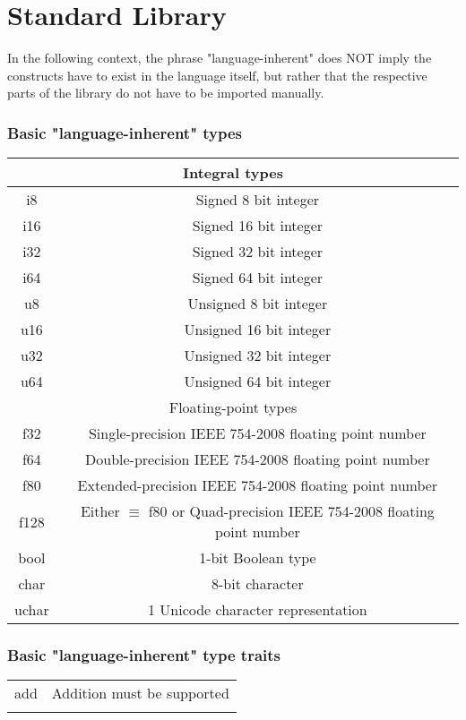 \documentclass{scrartcl}
\begin{document}
\part{Standard Library}

In the following context, the phrase "language-inherent" does NOT imply the constructs have to exist in the language itself, but rather that the respective parts of the library do not have to be imported manually.

\section{Basic "language-inherent" types}

\begin{table}[H]
    \centering
    \begin{tabular}{c|c}
    \multicolumn{2}{c}{Integral types} \\ \hline
        i8 & Signed 8 bit integer \\
        i16 & Signed 16 bit integer \\
        i32 & Signed 32 bit integer \\
        i64 & Signed 64 bit integer \\
        u8 & Unsigned 8 bit integer \\
        u16 & Unsigned 16 bit integer \\
        u32 & Unsigned 32 bit integer \\
        u64 & Unsigned 64 bit integer \\ \hline
    \multicolumn{2}{c}{Floating-point types} \\ \hline
        f32 & Single-precision IEEE 754-2008 floating point number \\
        f64 & Double-precision IEEE 754-2008 floating point number \\
        f80 & Extended-precision IEEE 754-2008 floating point number \\
        f128 & Either $\equiv$ f80 or Quad-precision IEEE 754-2008 floating point number \\ \hline
        bool & 1-bit Boolean type \\ \hline
        char & 8-bit character \\
        uchar & 1 Unicode character representation 
    \end{tabular}
\end{table}

\section{Basic "language-inherent" type traits}

\begin{table}[H]
    \centering
    \begin{tabular}{c|c}
        add & Addition must be supported \\
         & 
    \end{tabular}
\end{table}
\end{document}
